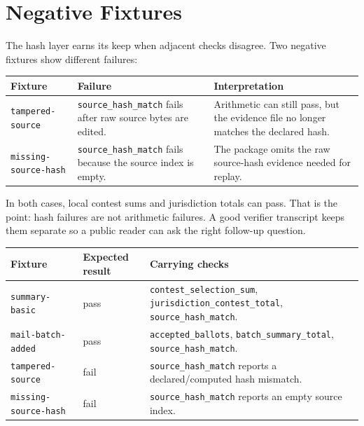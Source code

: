 \section{Negative Fixtures}

The hash layer earns its keep when adjacent checks disagree. Two negative
fixtures show different failures:

\begin{center}
\small
\begin{tabularx}{\textwidth}{lXX}
\toprule
Fixture & Failure & Interpretation \\
\midrule
\texttt{tampered-source} & \texttt{source\_hash\_match} fails after raw source bytes are edited. & Arithmetic can still pass, but the evidence file no longer matches the declared hash. \\
\texttt{missing-source-hash} & \texttt{source\_hash\_match} fails because the source index is empty. & The package omits the raw source-hash evidence needed for replay. \\
\bottomrule
\end{tabularx}
\end{center}

In both cases, local contest sums and jurisdiction totals can pass. That is the
point: hash failures are not arithmetic failures. A good verifier transcript
keeps them separate so a public reader can ask the right follow-up question.

\begin{center}
\small
\begin{tabularx}{\textwidth}{lXX}
\toprule
Fixture & Expected result & Carrying checks \\
\midrule
\texttt{summary-basic} & pass & \texttt{contest\_selection\_sum}, \texttt{jurisdiction\_contest\_total}, \texttt{source\_hash\_match}. \\
\texttt{mail-batch-added} & pass & \texttt{accepted\_ballots}, \texttt{batch\_summary\_total}, \texttt{source\_hash\_match}. \\
\texttt{tampered-source} & fail & \texttt{source\_hash\_match} reports a declared/computed hash mismatch. \\
\texttt{missing-source-hash} & fail & \texttt{source\_hash\_match} reports an empty source index. \\
\bottomrule
\end{tabularx}
\end{center}
